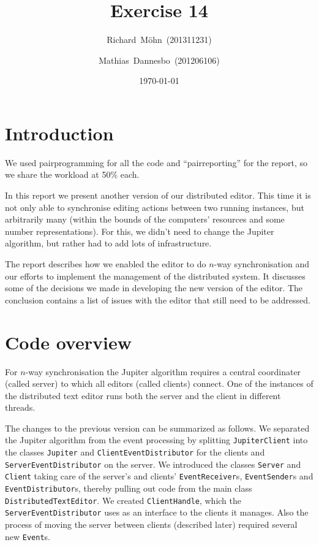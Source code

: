 \documentclass[a4paper,final,12pt,oneside,article,table]{memoir}
\newcommand{\supertitle}[1]{\gdef\suP{#1}}
\newcommand{\subtitle}[1]{\gdef\suB{#1}}
\newcommand{\stunum}[1]{\gdef\stuN{#1}}
\newcommand{\mil}[1]{\texttt{#1}}
\begin{document}
\supertitle{Distributed Systems}
\title{Exercise 14}
\author{Richard~Möhn~\small{(201311231)} \and Mathias~Dannesbo~\small{(201206106)}}
\date{\today}
\maketitle

\chapter{Introduction}
We used pairprogramming for all the code and ``pairreporting'' for the
report, so we share the workload at 50\% each.

In this report we present another version of our distributed editor.
This time it is not only able to synchronise editing actions between two
running instances, but arbitrarily many (within the bounds of the
computers' resources and some number representations). For this, we
didn't need to change the Jupiter algorithm, but rather had to add lots
of infrastructure.

The report describes how we enabled the editor to do $n$-way
synchronisation and our efforts to implement the management of the
distributed system. It discusses some of the decisions we made in
developing the new version of the editor. The conclusion contains a list
of issues with the editor that still need to be addressed.

\chapter{Code overview}

For $n$-way synchronisation the Jupiter algorithm requires a central
coordinater (called server) to which all editors (called clients)
connect. One of the instances of the distributed text editor runs both
the server and the client in different threads. 

The changes to the previous version can be summarized as follows.  We
separated the Jupiter algorithm from the event processing by splitting
\mil{JupiterClient} into the classes \mil{Jupiter} and
\mil{ClientEventDistributor} for the clients and
\mil{ServerEventDistributor} on the server.  We introduced the classes
\mil{Server} and \mil{Client} taking care of the server's and clients'
\mil{EventReceiver}s, \mil{EventSender}s and \mil{EventDistributor}s,
thereby pulling out code from the main class
\mil{DistributedTextEditor}.  We created \mil{ClientHandle}, which the
\mil{ServerEventDistributor} uses as an interface to the clients it
manages.  
Also the process of moving the server between clients (described later) 
required several new \mil{Event}s.
\end{document}
